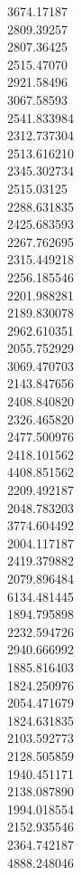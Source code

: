 3674.17187\\
2809.39257\\
2807.36425\\
2515.47070\\
2921.58496\\
3067.58593\\
2541.833984\\
2312.737304\\
2513.616210\\
2345.302734\\
2515.03125\\
2288.631835\\
2425.683593\\
2267.762695\\
2315.449218\\
2256.185546\\
2201.988281\\
2189.830078\\
2962.610351\\
2055.752929\\
3069.470703\\
2143.847656\\
2408.840820\\
2326.465820\\
2477.500976\\
2418.101562\\
4408.851562\\
2209.492187\\
2048.783203\\
3774.604492\\
2004.117187\\
2419.379882\\
2079.896484\\
6134.481445\\
1894.795898\\
2232.594726\\
2940.666992\\
1885.816403\\
1824.250976\\
2054.471679\\
1824.631835\\
2103.592773\\
2128.505859\\
1940.451171\\
2138.087890\\
1994.018554\\
2152.935546\\
2364.742187\\
4888.248046\\
